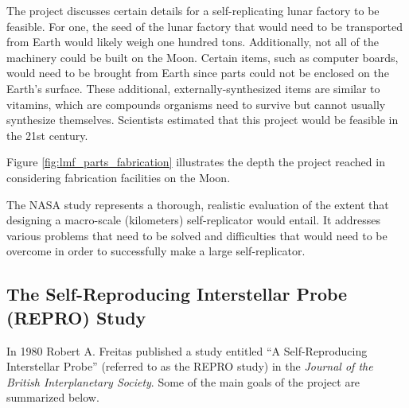 

The project discusses certain details for a self-replicating lunar factory to be feasible. For one, the seed of the lunar factory that would need to be transported from Earth would likely weigh one hundred tons. Additionally, not all of the machinery could be built on the Moon. Certain items, such as computer boards, would need to be brought from Earth since parts could not be enclosed on the Earth’s surface. These additional, externally-synthesized items are similar to vitamins, which are compounds organisms need to survive but cannot usually synthesize themselves.  Scientists estimated that this project would be feasible in the 21st century.

Figure \ref{fig:lmf_parts_fabrication} illustrates the depth the project reached in considering
fabrication facilities on the Moon.


The NASA study represents a thorough, realistic evaluation of the extent that designing a macro-scale (kilometers) self-replicator would entail. It addresses various problems that need to be solved and difficulties that would need to be overcome in order to successfully make a large self-replicator.

\subsection[The Self{}-Reproducing Interstellar Probe (REPRO) Study]{The
Self-Reproducing Interstellar Probe (REPRO) Study}

In 1980 Robert A. Freitas
published a study entitled ``A Self-Reproducing Interstellar Probe'' (referred to as the REPRO study) in
the \textit{Journal of the British Interplanetary Society}. Some of the
main goals of the project are summarized below.

